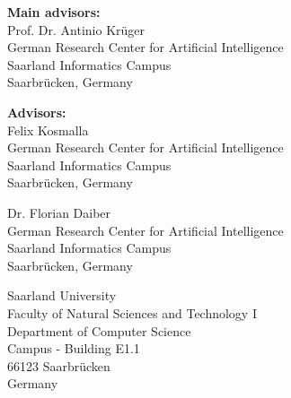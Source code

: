 \pagestyle{empty}

\vspace*{0.5cm}
\textbf{Main advisors:}\\
Prof. Dr. Antinio Krüger\\
German Research Center for Artificial Intelligence\\
Saarland Informatics Campus\\
Saarbrücken, Germany

\vspace*{0.5cm}
\textbf{Advisors:}\\
Felix Kosmalla\\
German Research Center for Artificial Intelligence\\
Saarland Informatics Campus\\
Saarbrücken, Germany

\vspace*{0.5cm}
Dr. Florian Daiber\\
German Research Center for Artificial Intelligence\\
Saarland Informatics Campus\\
Saarbrücken, Germany


\vspace{3.5cm}


\vspace{1.5cm}


\vspace{3cm}
Saarland University\\
Faculty of Natural Sciences and Technology I\\
Department of Computer Science\\
Campus - Building E1.1\\
66123 Saarbrücken\\
Germany\\


